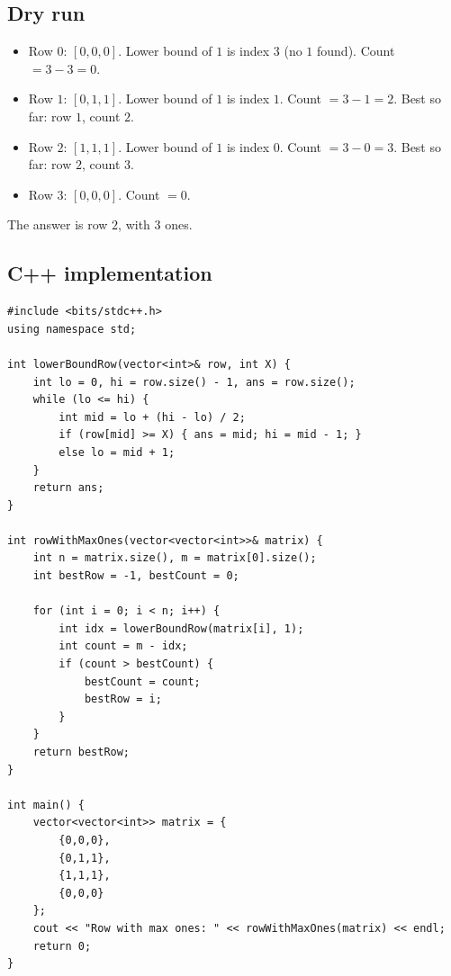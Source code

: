 \subsection*{Dry run}


\begin{itemize}
  \item Row $0$: $[0,0,0]$. Lower bound of $1$ is index $3$ (no $1$ found).
        Count $= 3-3=0$.
  \item Row $1$: $[0,1,1]$. Lower bound of $1$ is index $1$. Count
        $=3-1=2$. Best so far: row $1$, count $2$.
  \item Row $2$: $[1,1,1]$. Lower bound of $1$ is index $0$. Count
        $=3-0=3$. Best so far: row $2$, count $3$.
  \item Row $3$: $[0,0,0]$. Count $=0$.
\end{itemize}

The answer is row $2$, with $3$ ones.

\subsection*{C++ implementation}

\begin{lstlisting}
#include <bits/stdc++.h>
using namespace std;

int lowerBoundRow(vector<int>& row, int X) {
    int lo = 0, hi = row.size() - 1, ans = row.size();
    while (lo <= hi) {
        int mid = lo + (hi - lo) / 2;
        if (row[mid] >= X) { ans = mid; hi = mid - 1; }
        else lo = mid + 1;
    }
    return ans;
}

int rowWithMaxOnes(vector<vector<int>>& matrix) {
    int n = matrix.size(), m = matrix[0].size();
    int bestRow = -1, bestCount = 0;

    for (int i = 0; i < n; i++) {
        int idx = lowerBoundRow(matrix[i], 1);
        int count = m - idx;
        if (count > bestCount) {
            bestCount = count;
            bestRow = i;
        }
    }
    return bestRow;
}

int main() {
    vector<vector<int>> matrix = {
        {0,0,0},
        {0,1,1},
        {1,1,1},
        {0,0,0}
    };
    cout << "Row with max ones: " << rowWithMaxOnes(matrix) << endl;
    return 0;
}
\end{lstlisting}

